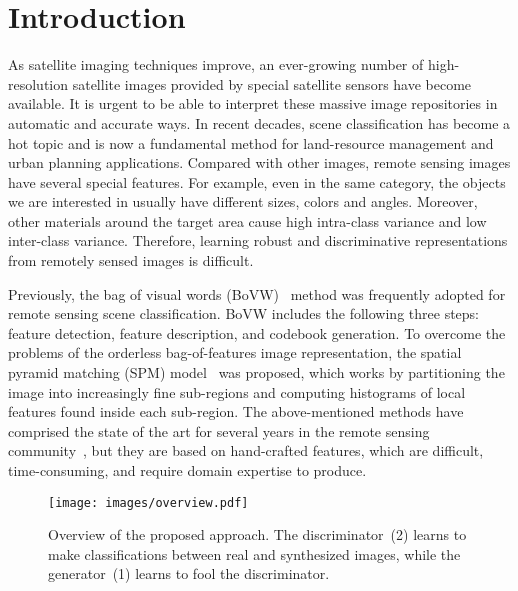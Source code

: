 \documentclass[journal]{IEEEtran}
\begin{document}
\IEEEpeerreviewmaketitle
























\section{Introduction}
\label{introduction}
As satellite imaging techniques improve, an ever-growing number of high-resolution satellite images provided by special satellite sensors have become available. It is urgent to be able to interpret these massive image repositories in automatic and accurate ways. In recent decades, scene classification has become a hot topic and is now a fundamental method for land-resource management and urban planning applications. Compared with other images, remote sensing images have several special features. For example, even in the same category, the objects we are interested in usually have different sizes, colors and angles. Moreover, other materials around the target area cause high intra-class variance and low inter-class variance. Therefore, learning robust and discriminative representations from remotely sensed images is difficult.

Previously, the bag of visual words (BoVW)~\cite{sivic2003video} method was frequently adopted for remote sensing scene classification. BoVW includes the following three steps: feature detection, feature description, and codebook generation. 
To overcome the problems of the orderless bag-of-features image representation, the spatial pyramid matching (SPM) model~\cite{lazebnik2006beyond} was proposed, which works by partitioning the image into increasingly fine sub-regions and computing histograms of local features found inside each sub-region. The above-mentioned methods have comprised the state of the art for several years in the remote sensing community~\cite{lienou2010semantic}, but they are based on hand-crafted features, which are difficult, time-consuming, and require domain expertise to produce.
\begin{figure}[t]
	\begin{center}
		\texttt{[image: images/overview.pdf]}
	\end{center}
	\vspace{-1em}
	\caption{ \label{overview}Overview of the proposed approach. The discriminator~(2) learns to make classifications between real and synthesized images, while the generator~(1) learns to fool the discriminator.
		\vspace{-3mm}
	}
\end{figure}
\end{document}
